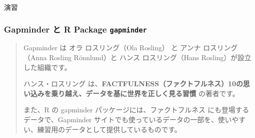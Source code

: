 \documentclass[
  xelatex, ja=standard]{bxjsbook}
\theoremstyle{definition}
\theoremstyle{definition}
\theoremstyle{definition}
\theoremstyle{definition}
\theoremstyle{remark}
\begin{document}
演習

\hypertarget{gapminder-ux3068-r-package-gapminder}{%
\subsubsection{\texorpdfstring{Gapminder と R Package \texttt{gapminder}}{Gapminder と R Package gapminder}}\label{gapminder-ux3068-r-package-gapminder}}

\begin{quote}
Gapminder は オラ ロスリング（Ola Rosling） と アンナ ロスリング（Anna Rosling Rönnlund）と ハンス ロスリング（Hans Rosling）が設立した組織です。

ハンス・ロスリング は、\textbf{FACTFULNESS（ファクトフルネス）10の思い込みを乗り越え、データを基に世界を正しく見る習慣} の著者です。

また、R の gapminder パッケージには、ファクトフルネス にも登場するデータで、Gapminder サイトでも使っているデータの一部を、使いやすい、練習用のデータとして提供しているものです。
\end{quote}
\end{document}
